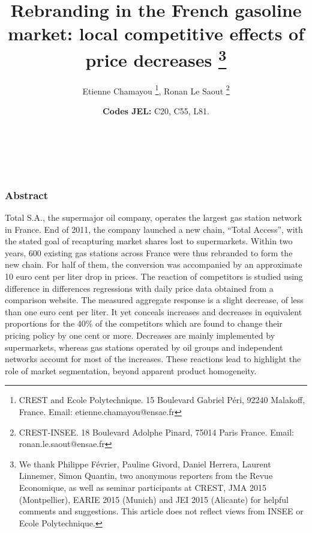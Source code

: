 \documentclass[english]{article}
\begin{document}
\title{Rebranding in the French gasoline market: local competitive effects
of price decreases%
\thanks{We thank Philippe Février, Pauline Givord, Daniel Herrera, Laurent
Linnemer, Simon Quantin, two anonymous reporters from the Revue Economique,
as well as seminar participants at CREST, JMA 2015 (Montpellier),
EARIE 2015 (Munich) and JEI 2015 (Alicante) for helpful comments and suggestions.
This article does not reflect views from INSEE or Ecole Polytechnique.%
}}


\author{Etienne Chamayou%
\thanks{CREST and Ecole Polytechnique. 15 Boulevard Gabriel Péri, 92240 Malakoff, France.
Email: etienne.chamayou@ensae.fr%
}, Ronan Le Saout%
\thanks{CREST-INSEE. 18 Boulevard Adolphe Pinard, 75014 Paris France. Email: ronan.le.saout@ensae.fr%
}}

\maketitle
\vspace{-1cm}
\ \\
\ \\
\subsubsection*{Abstract}

Total S.A., the supermajor oil company, operates the largest gas station network in France. End of 2011, the company launched a new chain, ``Total Access'', with the stated goal of recapturing market shares lost to supermarkets. Within two years, 600 existing gas stations across France were thus rebranded to form the new chain. For half of them, the conversion was accompanied by an approximate 10 euro cent per liter drop in prices. The reaction of competitors is studied using difference in differences regressions with daily price data obtained from a comparison website. The measured aggregate response is a slight decrease, of less than one euro cent per liter. It yet conceals increases and decreases in equivalent proportions for the 40\% of the competitors which are found to change their pricing policy by one cent or more. Decreases are mainly implemented by supermarkets, whereas gas stations operated by oil groups and independent networks account for most of the increases. These reactions lead to highlight the role of market segmentation, beyond apparent product homogeneity.

\date{\noindent \textbf{Codes JEL:} C20, C55, L81.}

\newpage{}
\end{document}
